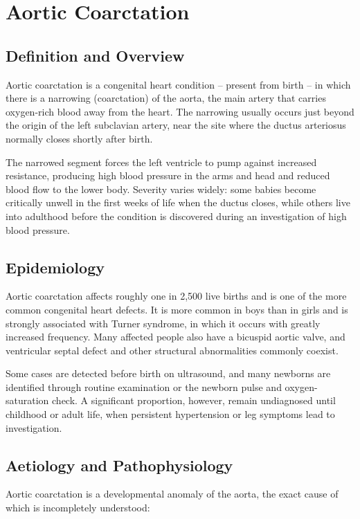 \chapter{Aortic Coarctation}

\section*{Definition and Overview}
Aortic coarctation is a congenital heart condition -- present from birth -- in which there is a narrowing (coarctation) of the aorta, the main artery that carries oxygen-rich blood away from the heart. The narrowing usually occurs just beyond the origin of the left subclavian artery, near the site where the ductus arteriosus normally closes shortly after birth.

The narrowed segment forces the left ventricle to pump against increased resistance, producing high blood pressure in the arms and head and reduced blood flow to the lower body. Severity varies widely: some babies become critically unwell in the first weeks of life when the ductus closes, while others live into adulthood before the condition is discovered during an investigation of high blood pressure.

\section*{Epidemiology}
Aortic coarctation affects roughly one in 2,500 live births and is one of the more common congenital heart defects. It is more common in boys than in girls and is strongly associated with Turner syndrome, in which it occurs with greatly increased frequency. Many affected people also have a bicuspid aortic valve, and ventricular septal defect and other structural abnormalities commonly coexist.

Some cases are detected before birth on ultrasound, and many newborns are identified through routine examination or the newborn pulse and oxygen-saturation check. A significant proportion, however, remain undiagnosed until childhood or adult life, when persistent hypertension or leg symptoms lead to investigation.

\section*{Aetiology and Pathophysiology}
Aortic coarctation is a developmental anomaly of the aorta, the exact cause of which is incompletely understood:

